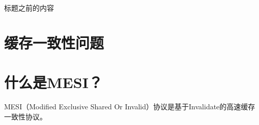 \documentclass{template}
\begin{document}
\ttfamily
标题之前的内容
\section{缓存一致性问题}

\section{什么是MESI？}
MESI（Modified Exclusive Shared Or Invalid）协议是基于Invalidate的高速缓存一致性协议。
\end{document}
